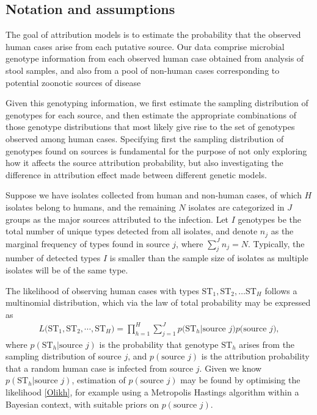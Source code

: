 \documentclass[AMA,STIX1COL]{WileyNJD-v2}
\begin{document}
\subsection{Notation and assumptions}
The goal of attribution models is to estimate the probability that the observed human cases arise from each putative source. Our data comprise microbial genotype information from each observed human case obtained from analysis of stool samples, and also from a pool of non-human cases corresponding to potential zoonotic sources of disease

Given this genotyping information, we first estimate the sampling distribution of genotypes for each source, and then estimate the appropriate combinations of those genotype distributions that most likely give rise to the set of genotypes observed among human cases. Specifying first the sampling distribution of genotypes found on sources is fundamental for the purpose of not only exploring how it affects the source attribution probability, but also investigating the difference in attribution effect made between different genetic models.

Suppose we have isolates collected from human and non-human cases, of which $H$ isolates belong to humans, and the remaining $N$ isolates are categorized in $J$ groups as the major sources attributed to the infection. Let $I$ genotypes be the total number of unique types detected from all isolates, and denote $n_j$ as the marginal frequency of types found in source $j$, where $\sum_j^J n_j = N$. Typically, the number of detected types $I$ is smaller than the sample size of isolates as multiple isolates will be of the same type.

The likelihood of observing human cases with types $\text{ST}_1, \text{ST}_2, \ldots \text{ST}_H$ follows a multinomial distribution, which via the law of total probability may be expressed as
\begin{align}
  L\Big(\text{ST}_1, \text{ST}_2, \cdots, \text{ST}_H \Big)=\prod_{h=1}^{H}\sum_{j=1}^{J} p\Big(\text{ST}_h \vert \text{source } j\Big) p\Big(\text{source }j\Big),
  \label{Olikh}
\end{align}
where $p(\text{ST}_h \vert \text{source }j)$ is the probability that genotype $\text{ST}_h$ arises from the sampling distribution of source $j$, and $p(\text{source }j)$ is the attribution probability that a random human case is infected from source $j$. Given we know $p(\text{ST}_h \vert \text{source }j)$, estimation of $p(\text{source }j)$ may be found by optimising the likelihood \eqref{Olikh}, for example using a Metropolis Hastings algorithm within a Bayesian context, with suitable priors on $p(\text{source }j)$.
\end{document}
